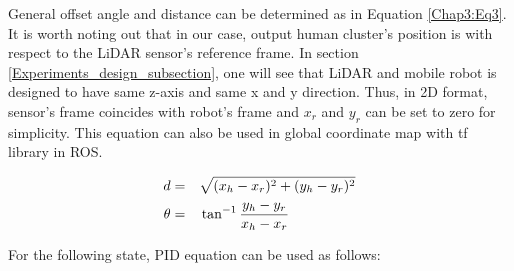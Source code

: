 General offset angle and distance can be determined as in Equation \ref{Chap3:Eq3}. It is
worth noting out that in our case, output human cluster's position is with respect to
the LiDAR sensor's reference frame. In section \ref{Experiments_design_subsection}, one will see that LiDAR and
mobile robot is designed to have same z-axis and same x and y direction. Thus, in 2D format, sensor's frame
coincides with robot's frame and $x_r$ and $y_r$ can be set to zero for simplicity. This equation can
also be used in global coordinate map with tf library \cite{tf_lib} in ROS.

\begin{equation}
    \label{Chap3:Eq3}
    \begin{split}
        d = \quad & \sqrt{(x_h - x_r)^2 + (y_h - y_r)^2} \\
        \theta =  \quad & \tan^{-1} {\frac{y_h - y_r}{x_h - x_r}}
    \end{split}
\end{equation}

\newpage

For the following state, PID equation can be used as follows:



